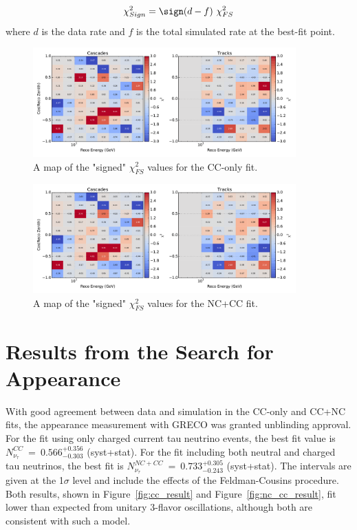 \begin{equation}
	\chi^2_{Sign} = \sign(d-f)\ \chi^2_{FS}
\end{equation}
%
where $d$ is the data rate and $f$ is the total simulated rate at the best-fit point.

\begin{figure}
\includegraphics[width=0.9\textwidth]{chi2_map_cc.pdf} 
\caption[The "signed" $\chi^2_{FS}$ values for the CC-only fit]{A map of the "signed" $\chi^2_{FS}$ values for the CC-only fit.}
\label{fig:chi2_map_cc}
\end{figure}

\begin{figure}
\includegraphics[width=0.9\textwidth]{chi2_map_nc_cc.pdf} 
\caption[The "signed" $\chi^2_{FS}$ values for the NC+CC fit]{A map of the "signed" $\chi^2_{FS}$ values for the NC+CC fit. }
\label{fig:chi2_map_nc_cc}
\end{figure}








\label{section:tau_results}
\section{Results from the Search for Appearance}
With good agreement between data and simulation in the CC-only and CC+NC fits, the appearance measurement with GRECO was granted unblinding approval.
For the fit using only charged current tau neutrino events, the best fit value is $N_{\nu_\tau}^{CC}~=~0.566^{+0.356}_{-0.303}$ (syst+stat).
For the fit including both neutral and charged tau neutrinos, the best fit is $N_{\nu_\tau}^{NC+CC}~=~0.733^{+0.305}_{-0.243}$ (syst+stat).
The intervals are given at the 1$\sigma$ level and include the effects of the Feldman-Cousins procedure.
Both results, shown in Figure~\ref{fig:cc_result} and Figure~\ref{fig:nc_cc_result}, fit lower than expected from unitary 3-flavor oscillations, although both are consistent with such a model.

